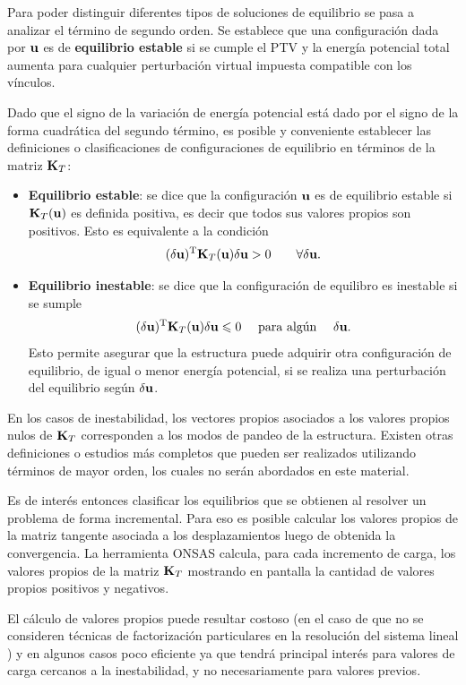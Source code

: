 Para poder distinguir diferentes tipos de soluciones de equilibrio se pasa a analizar el término de segundo orden. %
%
Se establece que una configuración dada por ${\bf u}$ es de \textbf{equilibrio estable} si se cumple el PTV y la energía potencial total aumenta para cualquier perturbación virtual impuesta compatible con los vínculos. %

%
Dado que el signo de la variación de energía potencial está dado por el signo de la forma cuadrática del segundo término, es posible y conveniente establecer las definiciones o clasificaciones de configuraciones de equilibrio en términos de la matriz ${\bf K}_T$:
%
\begin{itemize}
	\item \textbf{Equilibrio estable}: se dice que la configuración ${\bf u}$ es de equilibrio estable si ${\bf K}_T({\bf u})$ es definida positiva, es decir que todos sus valores propios son positivos. %
	Esto es equivalente a la condición
	$$( \delta {\bf u})^{\text{T}} {\bf K}_T({\bf u}) \delta {\bf u} >0 \qquad \forall \delta {\bf u}.$$ %
	
	\item \textbf{Equilibrio inestable}: se dice que la configuración de equilibro es inestable si se sumple %
	$$( \delta {\bf u})^{\text{T}} {\bf K}_T({\bf u}) \delta {\bf u} \leqslant 0 \quad \text{ para algún }  \quad \delta {\bf u}.$$ %
	Esto permite asegurar que la estructura puede adquirir otra configuración de equilibrio, de igual o menor energía potencial, si se realiza una perturbación del equilibrio según $\delta {\bf u}$. %
\end{itemize}

En los casos de inestabilidad, los vectores propios asociados a los valores propios nulos  de ${\bf K}_T$ corresponden a los modos de pandeo de la estructura. %
%
Existen otras definiciones o estudios más completos que pueden ser realizados utilizando términos de mayor orden, los cuales no serán abordados en este material.

Es de interés entonces clasificar los equilibrios que se obtienen al resolver un problema de forma incremental. Para eso es posible calcular los valores propios de la matriz tangente asociada a los desplazamientos luego de obtenida la convergencia.
%
La herramienta ONSAS calcula, para cada incremento de carga, los valores propios de la matriz ${\bf K}_{T}$ mostrando en pantalla la cantidad de valores propios positivos y negativos. %
%

El cálculo de valores propios puede resultar costoso (en el caso de que no se consideren técnicas de factorización particulares en la resolución del sistema lineal \citep{Bathe1982}) y en algunos casos poco eficiente ya que tendrá principal interés para valores de carga cercanos a la inestabilidad, y no necesariamente para valores previos. %

